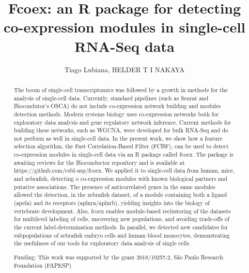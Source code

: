 \documentclass[twoside]{article}
\title{\vspace{-15mm}\fontsize{24pt}{10pt}\selectfont\textbf{ Fcoex: an R package for detecting co-expression modules in single-cell RNA-Seq data }} %
\author{ Tiago Lubiana, HELDER T I NAKAYA }
\affil{ Institute of Mathematics and Statistics,  University of S\~ao Paulo }
\date{}
\begin{document}
  
  
  \maketitle %
  
  
  \thispagestyle{fancy} %
  
  
  \begin{abstract}
  The boom of single-cell transcriptomics was followed by a growth in methods for the analysis of single-cell data. Currently,  standard pipelines (such as Seurat and Biocondutor’s OSCA) do not include co-expression network building and modules detection methods. Modern systems biology uses co-expression networks both for exploratory data analysis and gene regulatory network inference. Current methods for building these networks,  such as WGCNA,  were developed for bulk RNA-Seq and do not perform as well in single-cell data. In the present work,  we show how a feature selection algorithm,  the Fast Correlation-Based Filter (FCBF),  can be used to detect co-expression modules in single-cell data via an R package called fcoex. The package is awaiting reviews for the Bioconductor repository and is available at https://github.com/csbl-usp/fcoex. We applied it to single-cell data from human,  mice,  and zebrafish,  detecting o co-expression modules with known biological partners and putative associations. The presence of anticorrelated genes in the same modules allowed the detection,  in the zebrafish dataset,  of a module containing both a ligand (apela) and its receptors (aplnra/aplnrb),  yielding insights into the biology of vertebrate development. Also,  fcoex enables module-based reclustering of the datasets for multilevel labeling of cells,  uncovering new populations,  and avoiding trade-offs of the current label-determination methods. In parallel,  we detected new candidates for subpopulations of zebrafish embryo cells and human blood monocytes,  demonstrating the usefulness of our tools for exploratory data analysis of single cells.
  
  Funding: This work was supported by the grant 2018/10257-2,  S\~ao Paulo Research Foundation (FAPESP) \\ 
  \end{abstract}
  
\end{document}
